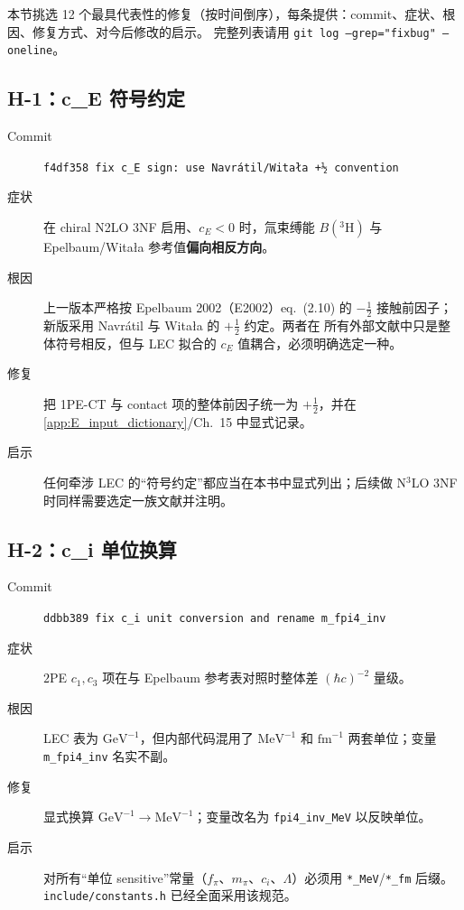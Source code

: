 本节挑选 12 个最具代表性的修复（按时间倒序），每条提供：commit、症状、根因、修复方式、对今后修改的启示。
完整列表请用 \texttt{git log --grep="fix\textbar bug" --oneline}。

\subsection{H-1：c\_E 符号约定}

\begin{description}
  \item[Commit] \texttt{f4df358 fix c\_E sign: use Navrátil/Witała +½ convention}
  \item[症状] 在 chiral N2LO 3NF 启用、\(c_E<0\) 时，氚束缚能 \(B(^3\!\mathrm{H})\) 与 Epelbaum/Witała 参考值\textbf{偏向相反方向}。
  \item[根因] 上一版本严格按 Epelbaum 2002（E2002）eq.~(2.10) 的 \(-\tfrac12\) 接触前因子；新版采用 Navrátil 与 Witała 的 \(+\tfrac12\) 约定。两者在
        所有外部文献中只是整体符号相反，但与 LEC 拟合的 \(c_E\) 值耦合，必须明确选定一种。
  \item[修复] 把 1PE-CT 与 contact 项的整体前因子统一为 \(+\tfrac12\)，并在 \cref{app:E_input_dictionary}/Ch.~15 中显式记录。
  \item[启示] 任何牵涉 LEC 的“符号约定”都应当在本书中显式列出；后续做 N\(^3\)LO 3NF 时同样需要选定一族文献并注明。
\end{description}

\subsection{H-2：c\_i 单位换算}

\begin{description}
  \item[Commit] \texttt{ddbb389 fix c\_i unit conversion and rename m\_fpi4\_inv}
  \item[症状] \(2\)PE \(c_1,c_3\) 项在与 Epelbaum 参考表对照时整体差 \((\hbar c)^{-2}\) 量级。
  \item[根因] LEC 表为 \(\mathrm{GeV}^{-1}\)，但内部代码混用了 \(\mathrm{MeV}^{-1}\) 和 \(\mathrm{fm}^{-1}\) 两套单位；变量 \texttt{m\_fpi4\_inv} 名实不副。
  \item[修复] 显式换算 \(\mathrm{GeV}^{-1}\to\mathrm{MeV}^{-1}\)；变量改名为 \texttt{fpi4\_inv\_MeV} 以反映单位。
  \item[启示] 对所有“单位 sensitive”常量（\(f_\pi\)、\(m_\pi\)、\(c_i\)、\(\Lambda\)）必须用 \texttt{*\_MeV}/\texttt{*\_fm} 后缀。\texttt{include/constants.h} 已经全面采用该规范。
\end{description}

